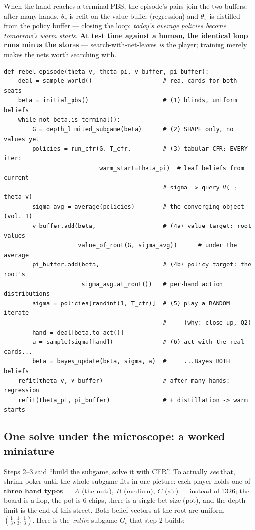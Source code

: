 \documentclass[11pt,a4paper]{article}
\begin{document}
When the hand reaches a terminal PBS, the episode's pairs join the two
buffers; after many hands, $\theta_v$ is refit on the value buffer
(regression) and $\theta_\pi$ is distilled from the policy buffer ---
closing the loop: \emph{today's average policies become tomorrow's warm
starts}. \textbf{At test time against a human, the identical loop runs
minus the stores} --- search-with-net-leaves \emph{is} the player; training
merely makes the nets worth searching with.

\begin{lstlisting}[style=py, caption={ReBeL's training loop --- the six steps above, in code. The same machinery runs at test time, minus the buffer writes.}]
def rebel_episode(theta_v, theta_pi, v_buffer, pi_buffer):
    deal = sample_world()                    # real cards for both seats
    beta = initial_pbs()                     # (1) blinds, uniform beliefs
    while not beta.is_terminal():
        G = depth_limited_subgame(beta)      # (2) SHAPE only, no values yet
        policies = run_cfr(G, T_cfr,         # (3) tabular CFR; EVERY iter:
                           warm_start=theta_pi)  # leaf beliefs from current
                                             # sigma -> query V(.; theta_v)
        sigma_avg = average(policies)        # the converging object (vol. 1)
        v_buffer.add(beta,                   # (4a) value target: root values
                     value_of_root(G, sigma_avg))      # under the average
        pi_buffer.add(beta,                  # (4b) policy target: the root's
                      sigma_avg.at_root())   # per-hand action distributions
        sigma = policies[randint(1, T_cfr)]  # (5) play a RANDOM iterate
                                             #     (why: close-up, Q2)
        hand = deal[beta.to_act()]
        a = sample(sigma[hand])              # (6) act with the real cards...
        beta = bayes_update(beta, sigma, a)  #     ...Bayes BOTH beliefs
    refit(theta_v, v_buffer)                 # after many hands: regression
    refit(theta_pi, pi_buffer)               # + distillation -> warm starts
\end{lstlisting}

\subsection{One solve under the microscope: a worked miniature}

Steps 2--3 said ``build the subgame, solve it with CFR''. To actually
\emph{see} that, shrink poker until the whole subgame fits in one picture:
each player holds one of \textbf{three hand types} --- $A$ (the nuts), $B$
(medium), $C$ (air) --- instead of 1326; the board is a flop, the pot is 6
chips, there is a single bet size (pot), and the depth limit is the end of
this street. Both belief vectors at the root are uniform
$(\frac13,\frac13,\frac13)$. Here is the \emph{entire} subgame $G_t$ that
step 2 builds:
\end{document}
